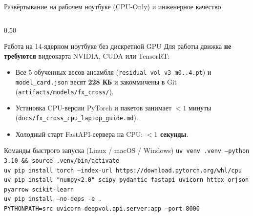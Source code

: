 \documentclass[aspectratio=169, 9pt]{beamer}
\begin{document}
\begin{frame}{Развёртывание на рабочем ноутбуке (CPU-Only) и инженерное качество}
  \begin{columns}[T]
    \begin{column}{0.50\textwidth}
      \begin{block}{Работа на 14-ядерном ноутбуке без дискретной GPU}
        Для работы движка \textbf{не требуются} видеокарта NVIDIA, CUDA или TensorRT:
        \begin{itemize}
          \item Все 5 обученных весов ансамбля (\texttt{residual\_vol\_v3\_m0..4.pt}) и \texttt{model\_card.json} весят \textbf{228 КБ} и закоммичены в Git (\texttt{artifacts/models/fx\_cross/}).
          \item Установка CPU-версии PyTorch и пакетов занимает $< 1$ минуты (\texttt{docs/fx\_cross\_cpu\_laptop\_guide.md}).
          \item Холодный старт FastAPI-сервера на CPU: \textbf{$< 1$ секунды}.
        \end{itemize}
      \end{block}

      \begin{block}{Команды быстрого запуска (Linux / macOS / Windows)}
        \scriptsize
        \texttt{uv venv .venv --python 3.10 \&\& source .venv/bin/activate}\\
        \texttt{uv pip install torch --index-url https://download.pytorch.org/whl/cpu}\\
        \texttt{uv pip install "numpy<2.0" scipy pydantic fastapi uvicorn httpx orjson pyarrow scikit-learn}\\
        \texttt{uv pip install --no-deps -e .}\\
        \texttt{PYTHONPATH=src uvicorn deepvol.api.server:app --port 8000}
      \end{block}
    \end{column}


\end{columns}
\end{frame}
\end{document}
